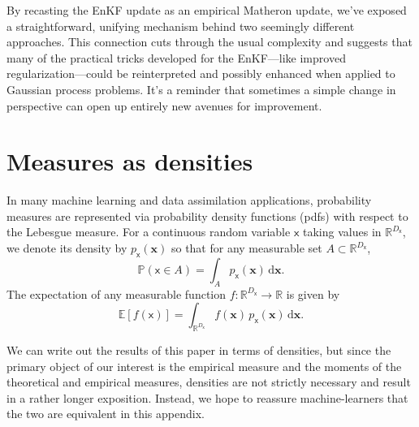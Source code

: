 \documentclass[wcp]{jmlr} %
\newcommand{\Ex}{\mathbb{E}}
\newcommand{\vv}[1]{\boldsymbol{#1}}
\newcommand{\rv}[1]{\mathsf{#1}}
\newcommand{\vrv}[1]{\vv{\rv{#1}}}
\renewcommand{\Pr}{\mathbb{P}}
\begin{document}
By recasting the EnKF update as an empirical Matheron update, we’ve exposed a straightforward, unifying mechanism behind two seemingly different approaches. This connection cuts through the usual complexity and suggests that many of the practical tricks developed for the EnKF—like improved regularization—could be reinterpreted and possibly enhanced when applied to Gaussian process problems. It’s a reminder that sometimes a simple change in perspective can open up entirely new avenues for improvement.





\appendix

\section{Measures as densities}\label{sec:densities-please}

In many machine learning and data assimilation applications, probability measures are represented via probability density functions (pdfs) with respect to the Lebesgue measure. For a continuous random variable \(\vrv{x}\) taking values in \(\mathbb{R}^{D_{\vrv{x}}}\), we denote its density by \(p_{\vrv{x}}(\vv{x})\) so that for any measurable set \(A \subset \mathbb{R}^{D_{\vrv{x}}}\),
\begin{equation}
    \Pr\left(\vrv{x} \in A\right)
    = \int_A p_{\vrv{x}}(\vv{x})\,\mathrm{d}\vv{x}.
\end{equation}
The expectation of any measurable function \(f:\mathbb{R}^{D_{\vrv{x}}}\to\mathbb{R}\) is given by
\begin{equation}
    \Ex[f(\vrv{x})] = \int_{\mathbb{R}^{D_{\vrv{x}}}} f(\vv{x})\,p_{\vrv{x}}(\vv{x})\,\mathrm{d}\vv{x}.
\end{equation}

We can write out the results of this paper in terms of densities, but since the primary object of our interest is the empirical measure and the moments of the theoretical and empirical measures, densities are not strictly necessary and result in a rather longer exposition.
Instead, we hope to reassure machine-learners that the two are equivalent in this appendix.
\end{document}
